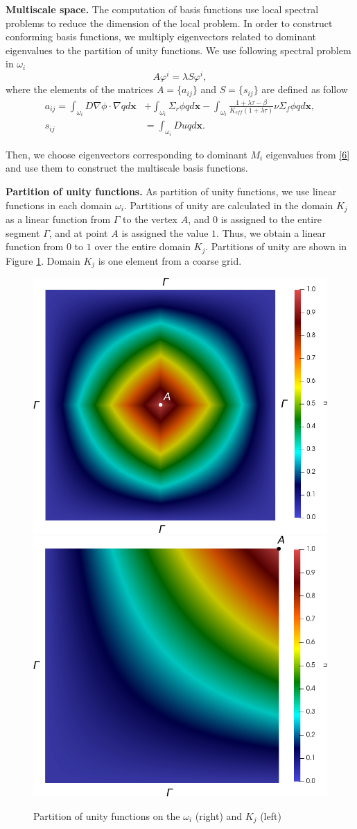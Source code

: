 \documentclass[10pt]{article}
\begin{document}
\textbf{Multiscale space.}
The computation of basis functions use local spectral problems to reduce the dimension of the local problem. 
In order to construct conforming basis functions, we multiply eigenvectors related to dominant eigenvalues to the partition of unity functions.
We use following spectral problem in $\omega_i$
\begin{equation} \label{6}
A \varphi^i = \lambda S \varphi^i,
\end{equation} 
where the elements of the matrices $A= \{ a_{ij} \}$ and $S = \{ s_{ij} \}$ are defined as follow{
\begin{equation} \label{7}
\begin{split}
a_{ij} = 
\int_{\omega_i} D \nabla\phi \cdot \nabla q d\bm x &+ 
\int_{\omega_i} \Sigma_r \phi q d\bm x - 
\int_{\omega_i} \frac{1+\lambda\tau-\beta}{K_{eff}(1+\lambda\tau)} \nu \Sigma_f \phi q d\bm x, \\
s_{ij} &= \int_{\omega _i} D u q d\bm x.
\end{split}
\end{equation}}

Then, we choose eigenvectors corresponding to dominant $M_{i}$ eigenvalues from \eqref{6} and use them to construct the multiscale basis functions.

\textbf{Partition of unity functions. } As  partition of unity functions, we use linear functions in each domain $\omega_i$.
Partitions of unity are calculated in the domain $ K_j $ as a linear function from $\Gamma$ to the vertex $ A $, and $ 0 $ is assigned to the entire segment $\Gamma$, and at point $ A $ is assigned the value $1$. 
Thus, we obtain a linear function from $ 0 $ to $ 1 $ over the entire domain $ K_j $. 
Partitions of unity are shown in Figure \ref{p2}. 
Domain $K_j$  is one element from a coarse grid. 
\begin{figure}[h!]
\centering
\includegraphics[width=0.45\linewidth]{pofs.png} 
\hspace{2em}
\includegraphics[width=0.45\linewidth]{pouK.png} 
\caption{Partition of unity functions on the $\omega_i$ (right) and $K_j$ (left)}
\label{p2}
\end{figure} 
 
\end{document}
